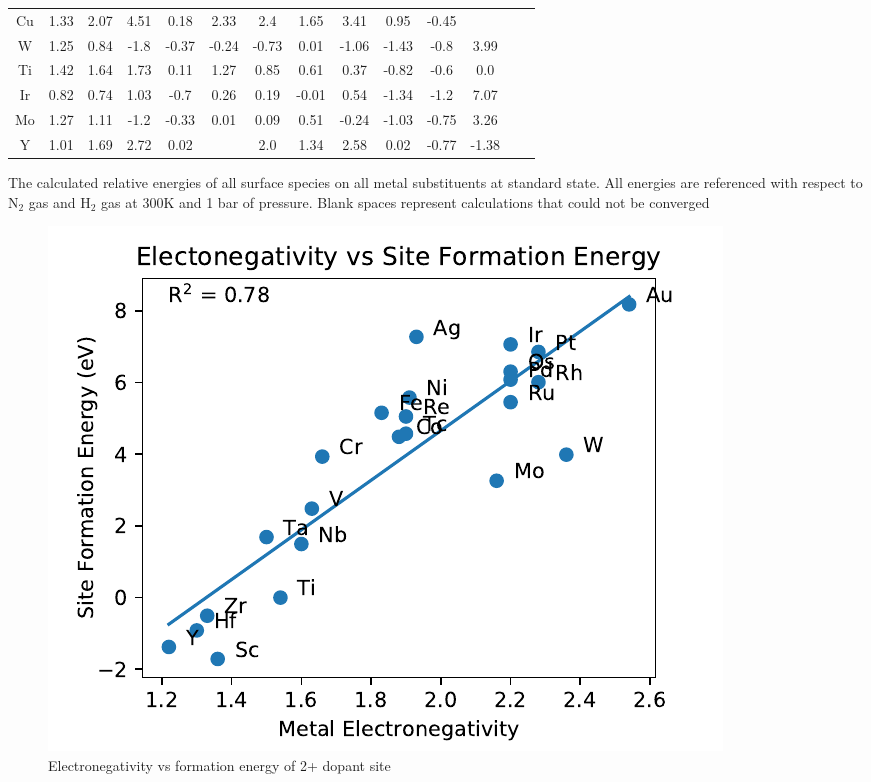 \begin{center}
\begin{tabular}{| c | c | c | c | c | c | c | c | c | c | c | c | c | c |}
Cu & 1.33 & 2.07 & 4.51 & 0.18 & 2.33 & 2.4 & 1.65 & 3.41 & 0.95 & -0.45 &  \\
W & 1.25 & 0.84 & -1.8 & -0.37 & -0.24 & -0.73 & 0.01 & -1.06 & -1.43 & -0.8 & 3.99 \\
Ti & 1.42 & 1.64 & 1.73 & 0.11 & 1.27 & 0.85 & 0.61 & 0.37 & -0.82 & -0.6 & 0.0 \\
Ir & 0.82 & 0.74 & 1.03 & -0.7 & 0.26 & 0.19 & -0.01 & 0.54 & -1.34 & -1.2 & 7.07 \\
Mo & 1.27 & 1.11 & -1.2 & -0.33 & 0.01 & 0.09 & 0.51 & -0.24 & -1.03 & -0.75 & 3.26 \\
Y & 1.01 & 1.69 & 2.72 & 0.02 &  & 2.0 & 1.34 & 2.58 & 0.02 & -0.77 & -1.38 \\
\hline
\end{tabular}
\caption{The calculated relative energies of all surface species on all metal substituents at standard state. All energies are referenced with respect to N$_2$ gas and H$_2$ gas at 300K and 1 bar of pressure. Blank spaces represent calculations that could not be converged}
\label{table:energies}
\end{center}



\begin{figure}
\centering
\includegraphics[width=0.8\linewidth]{Images/electronegativity_vs_formation.pdf}
\caption{Electronegativity vs formation energy of 2+ dopant site}
\end{figure}

